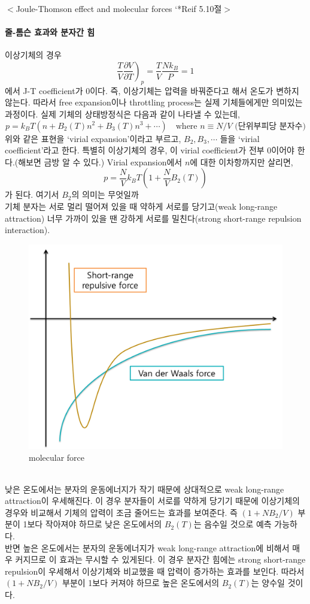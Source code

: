 \documentclass[a4paper,12pt]{article}
\begin{document}
	\begin{flushleft}
		$<$Joule-Thomson effect and molecular forces `*Reif 5.10절$>$ 
	\end{flushleft}
\paragraph{줄-톰슨 효과와 분자간 힘}
이상기체의 경우 
$$\left. \frac{T}{V}\frac{\partial V}{\partial T} \right)_p=\frac{T}{V}\frac{Nk_B}{P}=1 $$
에서 J-T coefficient가 0이다. 즉, 이상기체는 압력을 바꿔준다고 해서 온도가 변하지 않는다. 따라서 free expansion이나 throttling process는 실제 기체들에게만 의미있는 과정이다.
실제 기체의 상태방정식은 다음과 같이 나타낼 수 있는데,
$$p=k_BT(n+B_2(T)n^2+B_3(T)n^3+\cdots) \quad \mbox{where }n\equiv N/V \mbox{ (단위부피당 분자수)}$$
위와 같은 표현을  `virial expansion'이라고 부르고, $B_2,B_3,\cdots$ 들을 `virial coefficient'라고 한다. 특별히 이상기체의 경우, 이 virial coefficient가 전부 0이어야 한다.(해보면 금방 알 수 있다.) Virial expansion에서 $n$에 대한 이차항까지만 살리면,   
$$p=\frac{N}{V}k_BT\left(1+\frac{N}{V}B_2(T) \right) $$가 된다. 여기서 $B_2$의 의미는 무엇일까\\
기체 분자는 서로 멀리 떨어져 있을 때 약하게 서로를 당기고(weak long-range attraction) 너무 가까이 있을 땐 강하게 서로를 밀친다(strong short-range repulsion interaction).
\begin{figure}[h]
	\centering
	\includegraphics[width=0.5\columnwidth]{repulsive.png}
	\caption{molecular force}
\end{figure}\\
낮은 온도에서는 분자의 운동에너지가 작기 때문에 상대적으로 weak long-range attraction이 우세해진다. 이 경우 분자들이 서로를 약하게 당기기 때문에 이상기체의 경우와 비교해서 기체의 압력이 조금 줄어드는 효과를 보여준다. 즉 $(1+NB_2/V)$ 부분이 1보다 작아져야 하므로 낮은 온도에서의 $B_2(T)$는 음수일 것으로 예측 가능하다.\\
반면 높은 온도에서는 분자의 운동에너지가 weak long-range attraction에 비해서 매우 커지므로 이 효과는 무시할 수 있게된다. 이 경우 분자간 힘에는 strong short-range repulsion이 우세해서 이상기체와 비교했을 때 압력이 증가하는 효과를 보인다. 따라서 $(1+NB_2/V)$ 부분이 1보다 커져야 하므로 높은 온도에서의 $B_2(T)$는 양수일 것이다. 
\end{document}
